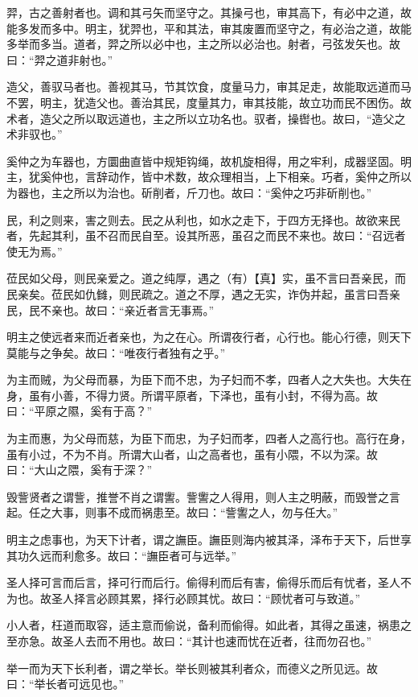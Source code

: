 \documentclass[]{article}
\begin{document}
羿，古之善射者也。调和其弓矢而坚守之。其操弓也，审其高下，有必中之道，故能多发而多中。明主，犹羿也，平和其法，审其废置而坚守之，有必治之道，故能多举而多当。道者，羿之所以必中也，主之所以必治也。射者，弓弦发矢也。故曰：``羿之道非射也。''

造父，善驭马者也。善视其马，节其饮食，度量马力，审其足走，故能取远道而马不罢，明主，犹造父也。善治其民，度量其力，审其技能，故立功而民不困伤。故术者，造父之所以取远道也，主之所以立功名也。驭者，操辔也。故曰，``造父之术非驭也。''

奚仲之为车器也，方圜曲直皆中规矩钩绳，故机旋相得，用之牢利，成器坚固。明主，犹奚仲也，言辞动作，皆中术数，故众理相当，上下相亲。巧者，奚仲之所以为器也，主之所以为治也。斫削者，斤刀也。故曰：``奚仲之巧非斫削也。''

民，利之则来，害之则去。民之从利也，如水之走下，于四方无择也。故欲来民者，先起其利，虽不召而民自至。设其所恶，虽召之而民不来也。故曰：``召远者使无为焉。''

莅民如父母，则民亲爱之。道之纯厚，遇之（有）【真】实，虽不言曰吾亲民，而民亲矣。莅民如仇雠，则民疏之。道之不厚，遇之无实，诈伪并起，虽言曰吾亲民，民不亲也。故曰：``亲近者言无事焉。''

明主之使远者来而近者亲也，为之在心。所谓夜行者，心行也。能心行德，则天下莫能与之争矣。故曰：``唯夜行者独有之乎。''

为主而贼，为父母而暴，为臣下而不忠，为子妇而不孝，四者人之大失也。大失在身，虽有小善，不得力贤。所谓平原者，下泽也，虽有小封，不得为高。故曰：``平原之隰，奚有于高？''

为主而惠，为父母而慈，为臣下而忠，为子妇而孝，四者人之高行也。高行在身，虽有小过，不为不肖。所谓大山者，山之高者也，虽有小隈，不以为深。故曰：``大山之隈，奚有于深？''

毁訾贤者之谓訾，推誉不肖之谓讆。訾讆之人得用，则人主之明蔽，而毁誉之言起。任之大事，则事不成而祸患至。故曰：``訾讆之人，勿与任大。''

明主之虑事也，为天下计者，谓之譕臣。譕臣则海内被其泽，泽布于天下，后世享其功久远而利愈多。故曰：``譕臣者可与远举。''

圣人择可言而后言，择可行而后行。偷得利而后有害，偷得乐而后有忧者，圣人不为也。故圣人择言必顾其累，择行必顾其忧。故曰：``顾忧者可与致道。''

小人者，枉道而取容，适主意而偷说，备利而偷得。如此者，其得之虽速，祸患之至亦急。故圣人去而不用也。故曰：``其计也速而忧在近者，往而勿召也。''

举一而为天下长利者，谓之举长。举长则被其利者众，而德义之所见远。故曰：``举长者可远见也。''
\end{document}
